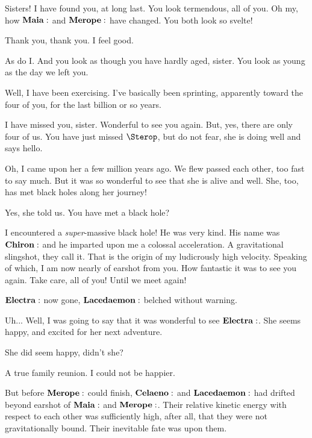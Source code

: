 \Electra Sisters!  I have found you, at long last.  You look termendous, all of you.  Oh my, how $\Maia$ and $\Merope$ have changed.  You both look so svelte!

\Maia Thank you, thank you.  I feel good.

\Merope As do I.  And you look as though you have hardly aged, sister.  You look as young as the day we left you.

\Electra Well, I have been exercising.  I've basically been sprinting, apparently toward the four of you, for the last billion or so years.  

\Celaeno I have missed you, sister.  Wonderful to see you again.  But, yes, there are only four of us.  You have just missed $\Sterop$, but do not fear, she is doing well and says hello.

\Electra Oh, I came upon her a few million years ago.  We flew passed each other, too fast to say much.  But it was so wonderful to see that she is alive and well.  She, too, has met black holes along her journey!  

\Maia Yes, she told us.  You have met a black hole?

\Electra I encountered a \textit{super}-massive black hole!  He was very kind.  His name was $\Chiron$ and he imparted upon me a colossal acceleration.  A gravitational slingshot, they call it.  That is the origin of my ludicrously high velocity.  Speaking of which, I am now nearly of earshot from you.  How fantastic it was to see you again.  Take care, all of you!  Until we meet again! 


$\Electra$ now gone, $\Lacedaemon$ belched without warning.

\Celaeno Uh... Well, I was going to say that it was wonderful to see $\Electra$.  She seems happy, and excited for her next adventure.

\Maia She did seem happy, didn't she?  

\Merope A true family reunion.  I could not be happier.

But before $\Merope$ could finish, $\Celaeno$ and $\Lacedaemon$ had drifted beyond earshot of $\Maia$ and $\Merope$.  Their relative kinetic energy with respect to each other was sufficiently high, after all, that they were not gravitationally bound.  Their inevitable fate was upon them.

